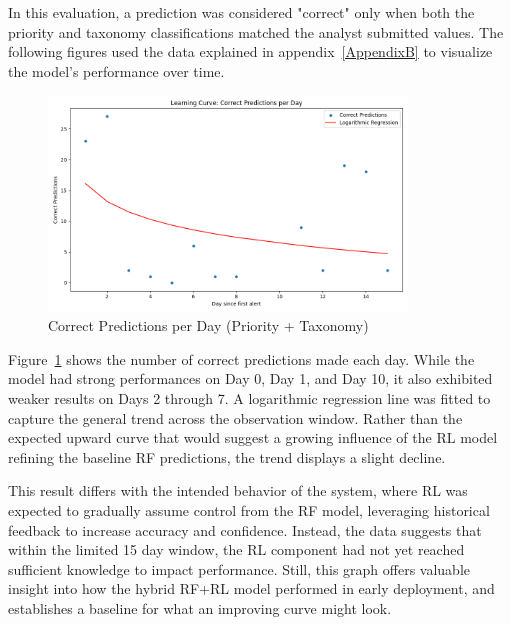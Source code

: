 In this evaluation, a prediction was considered "correct" only when both the priority and taxonomy classifications matched the analyst submitted values.
The following figures used the data explained in appendix~\ref{AppendixB} to visualize the model's performance over time.

\begin{figure}[h!]
    \centering
    \includegraphics[width=0.85\textwidth]{ch4/assets/learning_curve_corrects.png}
    \caption{Correct Predictions per Day (Priority + Taxonomy)}
    \label{fig:learning_curve_corrects}
\end{figure}

Figure~\ref{fig:learning_curve_corrects} shows the number of correct predictions made each day. 
While the model had strong performances on Day 0, Day 1, and Day 10, it also exhibited weaker results on Days 2 through 7. 
A logarithmic regression line was fitted to capture the general trend across the observation window.
Rather than the expected upward curve that would suggest a growing influence of the RL model refining the baseline RF predictions, the trend displays a slight decline.

This result differs with the intended behavior of the system, where RL was expected to gradually assume control from the RF model, leveraging historical feedback to increase accuracy and confidence.
Instead, the data suggests that within the limited 15 day window, the RL component had not yet reached sufficient knowledge to impact performance.
Still, this graph offers valuable insight into how the hybrid RF+RL model performed in early deployment, and establishes a baseline for what an improving curve might look.

